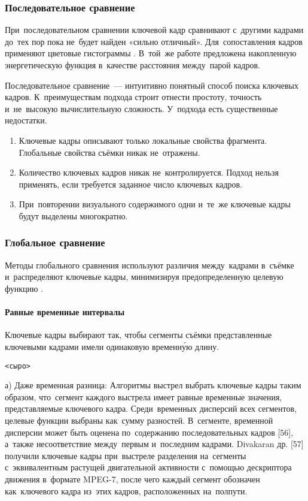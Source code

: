\subsubsection{Последовательное сравнение}

При~последовательном сравнении ключевой кадр сравнивают
с~другими кадрами до~тех пор пока не~будет найден «сильно отличный».
Для~сопоставления кадров применяют цветовые гистограммы \cite{Zhang:2003}.
В~той~же работе предложена накопленную энергетическую функция в~качестве
расстояния между~парой кадров.

Последовательное сравнение~— интуитивно понятный способ
поиска ключевых кадров.
К~преимуществам подхода строит отнести простоту, точность
и~не~высокую вычислительную сложность.
У~подхода есть существенные недостатки.
\begin{enumerate}
    \item Ключевые кадры описывают только локальные свойства фрагмента.
            Глобальные свойства съёмки никак не~отражены.
    \item Количество ключевых кадров никак не~контролируется.
            Подход нельзя применять, если требуется заданное число
            ключевых кадров.
    \item При~повторении визуального содержимого одни и~те~же
            ключевые кадры будут выделены многократно.
\end{enumerate}

\subsubsection{Глобальное сравнение}

Методы глобального сравнения используют различия между~кадрами
в~съёмке и~распределяют ключевые кадры,
минимизируя предопределенную целевую функцию \cite{Truong:2007}.

\paragraph{Равные временные интервалы}

Ключевые кадры выбирают так,
чтобы сегменты съёмки представленные ключевыми кадрами
имели одинаковую временну́ю длину.


{\tt <сыро>}

а) Даже временная разница: Алгоритмы выстрел выбрать ключевые кадры таким образом, что~сегмент каждого выстрела имеет равные временные значения, представляемые ключевого кадра. Среди~временных дисперсий всех сегментов, целевые функции выбраны как~сумму разностей. В~сегменте, временной дисперсии может быть оценена по~содержанию последовательных кадров [56], а~также несоответствие между~первым и~последним кадрами. Divakaran др. [57] получили ключевые кадры при~выстреле разделения на~сегменты с~эквивалентным растущей двигательной активности с~помощью дескриптора движения в~формате MPEG-7, после чего каждый сегмент обозначен как~ключевого кадра из~этих кадров, расположенных на~полпути.

